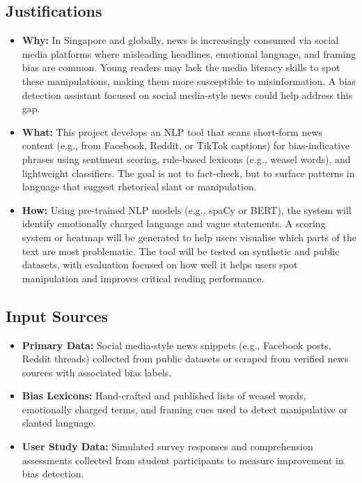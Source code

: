 \documentclass[12pt]{article}
\begin{document}
\subsection*{Justifications}
\begin{itemize}
\item \textbf{Why:} In Singapore and globally, news is increasingly consumed via social media platforms where misleading headlines, emotional language, and framing bias are common. Young readers may lack the media literacy skills to spot these manipulations, making them more susceptible to misinformation. A bias detection assistant focused on social media-style news could help address this gap.
\item  \textbf{What:} This project develops an NLP tool that scans short-form news content (e.g., from Facebook, Reddit, or TikTok captions) for bias-indicative phrases using sentiment scoring, rule-based lexicons (e.g., weasel words), and lightweight classifiers. The goal is not to fact-check, but to surface patterns in language that suggest rhetorical slant or manipulation.
\item  \textbf{How:} Using pre-trained NLP models (e.g., spaCy or BERT), the system will identify emotionally charged language and vague statements. A scoring system or heatmap will be generated to help users visualise which parts of the text are most problematic. The tool will be tested on synthetic and public datasets, with evaluation focused on how well it helps users spot manipulation and improves critical reading performance.
\end{itemize}

\subsection*{Input Sources}
\begin{itemize}
    \item \textbf{Primary Data:} Social media-style news snippets (e.g., Facebook posts, Reddit threads) collected from public datasets or scraped from verified news sources with associated bias labels.
    \item \textbf{Bias Lexicons:} Hand-crafted and published lists of weasel words, emotionally charged terms, and framing cues used to detect manipulative or slanted language.
    \item \textbf{User Study Data:} Simulated survey responses and comprehension assessments collected from student participants to measure improvement in bias detection.
\end{itemize}
\end{document}
